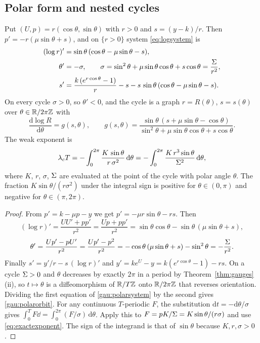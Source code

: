 \subsection{Polar form and nested cycles}
\begin{proposition}\label{prop:polar}
Put $(U,p)=r(\cos\theta,\sin\theta)$ with $r>0$ and $s=(y-k)/r$. Then $p'=-r(\mu\sin\theta+s)$, and on $\{r>0\}$ system \eqref{eq:logsystem} is
\begin{equation}\label{gau:polarsystem}
\begin{aligned}
(\log r)'&=\sin\theta\,(\cos\theta-\mu\sin\theta-s),\\
\theta'&=-\sigma,\qquad \sigma=\sin^2\theta+\mu\sin\theta\cos\theta+s\cos\theta=\frac{\Sigma}{r^2},\\
s'&=\frac{k\,(e^{r\cos\theta}-1)}{r}-s-s\,\sin\theta\,(\cos\theta-\mu\sin\theta-s).
\end{aligned}
\end{equation}
On every cycle $\sigma>0$, so $\theta'<0$, and the cycle is a graph $r=R(\theta)$, $s=s(\theta)$ over $\theta\in\mathbb R/2\pi\mathbb Z$ with
\begin{equation}\label{gau:polarorbit}
\frac{\mathrm d\log R}{\mathrm d\theta}=g(s,\theta),\qquad
g(s,\theta)=\frac{\sin\theta\,(s+\mu\sin\theta-\cos\theta)}{\sin^2\theta+\mu\sin\theta\cos\theta+s\cos\theta}.
\end{equation}
The weak exponent is
\begin{equation}\label{gau:polarexponent}
\lambda_cT=-\int_0^{2\pi}\frac{K\,\sin\theta}{r\,\sigma^2}\,\mathrm d\theta
=-\int_0^{2\pi}\frac{K\,r^3\sin\theta}{\Sigma^2}\,\mathrm d\theta ,
\end{equation}
where $K$, $r$, $\sigma$, $\Sigma$ are evaluated at the point of the cycle with polar angle $\theta$. The fraction $K\sin\theta/(r\sigma^2)$ under the integral sign is positive for $\theta\in(0,\pi)$ and negative for $\theta\in(\pi,2\pi)$.
\end{proposition}
\begin{proof}
From $p'=k-\mu p-y$ we get $p'=-\mu r\sin\theta-rs$. Then
\[
(\log r)'=\frac{UU'+pp'}{r^2}=\frac{Up+pp'}{r^2}=\sin\theta\cos\theta-\sin\theta\,(\mu\sin\theta+s),
\]
\[
\theta'=\frac{Up'-pU'}{r^2}=\frac{Up'-p^2}{r^2}=-\cos\theta\,(\mu\sin\theta+s)-\sin^2\theta=-\frac{\Sigma}{r^2}.
\]
Finally $s'=y'/r-s\,(\log r)'$ and $y'=ke^U-y=k(e^{r\cos\theta}-1)-rs$. On a cycle $\Sigma>0$ and $\theta$ decreases by exactly $2\pi$ in a period by Theorem~\ref{thm:gauges}(ii), so $t\mapsto\theta$ is a diffeomorphism of $\mathbb R/T\mathbb Z$ onto $\mathbb R/2\pi\mathbb Z$ that reverses orientation. Dividing the first equation of \eqref{gau:polarsystem} by the second gives \eqref{gau:polarorbit}. For any continuous $T$-periodic $F$, the substitution $\mathrm dt=-\mathrm d\theta/\sigma$ gives $\int_0^TF\dd=\int_0^{2\pi}(F/\sigma)\,\mathrm d\theta$. Apply this to $F=pK/\Sigma=K\sin\theta/(r\sigma)$ and use \eqref{eq:exactexponent}. The sign of the integrand is that of $\sin\theta$ because $K,r,\sigma>0$.
\end{proof}

